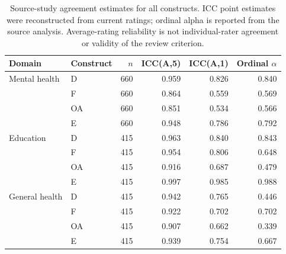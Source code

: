 \begin{table}[htbp]
\centering\small
\caption{Source-study agreement estimates for all constructs. ICC point estimates were reconstructed from current ratings; ordinal alpha is reported from the source analysis. Average-rating reliability is not individual-rater agreement or validity of the review criterion.}
\label{tab:reliability}
\begin{tabular}{llrrrr}
\toprule
Domain & Construct & $n$ & ICC(A,5) & ICC(A,1) & Ordinal $\alpha$ \\
\midrule
Mental health & D & 660 & 0.959 & 0.826 & 0.840 \\
 & F & 660 & 0.864 & 0.559 & 0.569 \\
 & OA & 660 & 0.851 & 0.534 & 0.566 \\
 & E & 660 & 0.948 & 0.786 & 0.792 \\
Education & D & 415 & 0.963 & 0.840 & 0.843 \\
 & F & 415 & 0.954 & 0.806 & 0.648 \\
 & OA & 415 & 0.916 & 0.687 & 0.479 \\
 & E & 415 & 0.997 & 0.985 & 0.988 \\
General health & D & 415 & 0.942 & 0.765 & 0.446 \\
 & F & 415 & 0.922 & 0.702 & 0.702 \\
 & OA & 415 & 0.907 & 0.662 & 0.339 \\
 & E & 415 & 0.939 & 0.754 & 0.667 \\
\bottomrule
\end{tabular}
\end{table}
